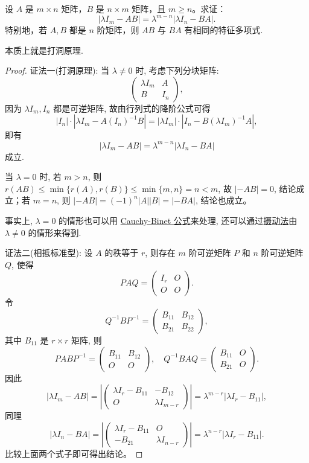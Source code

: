 \documentclass[../../main.tex]{subfiles}
\begin{document}
\begin{theorem}[特征值的降价公式]\label{theorem:特征值的降价公式}
设 \( A \) 是 \( m \times n \) 矩阵，\( B \) 是 \( n \times m \) 矩阵，且 \( m \geq n \)。求证：
\[
|\lambda I_m - AB| = \lambda^{m-n} |\lambda I_n - BA|.
\]
特别地，若 \( A, B \) 都是 \( n \) 阶矩阵，则 \( AB \) 与 \( BA \) 有相同的特征多项式.
\end{theorem}
\begin{note}
本质上就是打洞原理.
\end{note}
\begin{proof}
{\color{blue}证法一(打洞原理):} 当 \(\lambda \neq 0\) 时, 考虑下列分块矩阵:
\[
\begin{pmatrix}
\lambda I_m & A \\
B & I_n
\end{pmatrix},
\]
因为 \(\lambda I_m, I_n\) 都是可逆矩阵, 故由行列式的降阶公式可得
\[
|I_n| \cdot |\lambda I_m - A(I_n)^{-1}B| = |\lambda I_m| \cdot |I_n - B(\lambda I_m)^{-1}A|,
\]
即有
\[
|\lambda I_m - AB| = \lambda^{m-n} |\lambda I_n - BA|
\]
成立.

当 \(\lambda = 0\) 时, 若 \(m > n\), 则 \(r(AB) \leq \min\{r(A), r(B)\} \leq \min\{m, n\} = n < m\), 故 \(|-AB| = 0\), 结论成立；若 \(m = n\), 则 \(|-AB| = (-1)^n |A||B| = |-BA|\), 结论也成立。

事实上, \(\lambda = 0\) 的情形也可以用 \hyperref[theorem:Cauchy-Binet公式]{Cauchy-Binet 公式}来处理, 还可以通过\hyperref[proposition:摄动法基本命题]{摄动法}由 \(\lambda \neq 0\) 的情形来得到.

{\color{blue}证法二(相抵标准型):} 设 \(A\) 的秩等于 \(r\), 则存在 \(m\) 阶可逆矩阵 \(P\) 和 \(n\) 阶可逆矩阵 \(Q\), 使得
\[
PAQ = \begin{pmatrix}
I_r & O \\
O & O
\end{pmatrix}.
\]
令
\[
Q^{-1}BP ^{-1}= \begin{pmatrix}
B_{11} & B_{12} \\
B_{21} & B_{22}
\end{pmatrix},
\]
其中 \(B_{11}\) 是 \(r \times r\) 矩阵, 则
\[
PABP^{-1} = \begin{pmatrix}
B_{11} & B_{12} \\
O & O
\end{pmatrix}, \quad Q^{-1}BAQ = \begin{pmatrix}
B_{11} & O \\
B_{21} & O
\end{pmatrix}.
\]
因此
\[
|\lambda I_m - AB| = \left| \begin{pmatrix}
\lambda I_r - B_{11} & -B_{12} \\
O & \lambda I_{m-r}
\end{pmatrix} \right| = \lambda^{m-r} |\lambda I_r - B_{11}|,
\]
同理
\[
|\lambda I_n - BA| = \left| \begin{pmatrix}
\lambda I_r - B_{11} & O \\
-B_{21} & \lambda I_{n-r}
\end{pmatrix} \right| = \lambda^{n-r} |\lambda I_r - B_{11}|.
\]
比较上面两个式子即可得出结论。


\end{proof}
\end{document}
